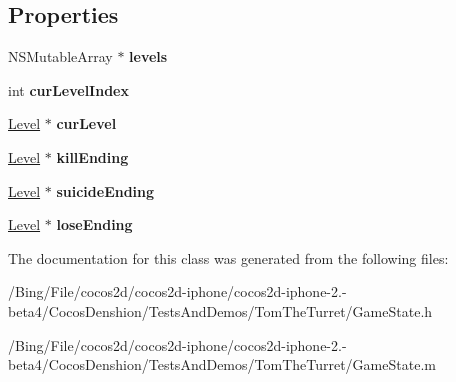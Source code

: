 \subsection*{Properties}
\begin{DoxyCompactItemize}
\item 
\hypertarget{interface_game_state_ab0a2f3821a58eb94a06c898ae1cf58c5}{N\-S\-Mutable\-Array $\ast$ {\bfseries levels}}\label{interface_game_state_ab0a2f3821a58eb94a06c898ae1cf58c5}

\item 
\hypertarget{interface_game_state_ae8a2084f73a664eb6b5c244e2ba66006}{int {\bfseries cur\-Level\-Index}}\label{interface_game_state_ae8a2084f73a664eb6b5c244e2ba66006}

\item 
\hypertarget{interface_game_state_a8cd2b2a94edd9738f4f6ac38ddbd055d}{\hyperlink{interface_level}{Level} $\ast$ {\bfseries cur\-Level}}\label{interface_game_state_a8cd2b2a94edd9738f4f6ac38ddbd055d}

\item 
\hypertarget{interface_game_state_a5f5729cb753c169aec7eff865a6cd8c2}{\hyperlink{interface_level}{Level} $\ast$ {\bfseries kill\-Ending}}\label{interface_game_state_a5f5729cb753c169aec7eff865a6cd8c2}

\item 
\hypertarget{interface_game_state_a3b8657cf233f5df5d4aef1adf682c57f}{\hyperlink{interface_level}{Level} $\ast$ {\bfseries suicide\-Ending}}\label{interface_game_state_a3b8657cf233f5df5d4aef1adf682c57f}

\item 
\hypertarget{interface_game_state_a213531be41a3192e791d025e4829d0c6}{\hyperlink{interface_level}{Level} $\ast$ {\bfseries lose\-Ending}}\label{interface_game_state_a213531be41a3192e791d025e4829d0c6}

\end{DoxyCompactItemize}


The documentation for this class was generated from the following files\-:\begin{DoxyCompactItemize}
\item 
/\-Bing/\-File/cocos2d/cocos2d-\/iphone/cocos2d-\/iphone-\/2.-\/beta4/\-Cocos\-Denshion/\-Tests\-And\-Demos/\-Tom\-The\-Turret/Game\-State.\-h\item 
/\-Bing/\-File/cocos2d/cocos2d-\/iphone/cocos2d-\/iphone-\/2.-\/beta4/\-Cocos\-Denshion/\-Tests\-And\-Demos/\-Tom\-The\-Turret/Game\-State.\-m\end{DoxyCompactItemize}
